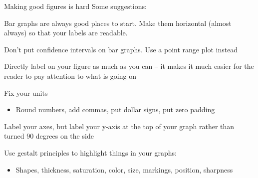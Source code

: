 \documentclass[notes,11pt, aspectratio=169]{beamer}
\newenvironment{wideitemize}{\itemize\addtolength{\itemsep}{10pt}}{\enditemize}
\begin{document}
\begin{frame}{Making good figures is hard}
  Some suggestions:
  \begin{wideitemize}
  \item Bar graphs are always good places to start. Make them
    horizontal (almost always) so that your labels are readable.
  \item Don't put confidence intervals on bar graphs. Use a point
    range plot instead
  \item Directly label on your figure as much as you can -- it makes
    it much easier for the reader to pay attention to what is going on
  \item Fix your units
    \begin{itemize}
    \item Round numbers, add commas, put dollar signs, put zero
      padding
    \end{itemize}
  \item Label your axes, but label your y-axis at the top of your
    graph rather than turned 90 degrees on the side
  \item Use gestalt principles to highlight things in your graphs:
    \begin{itemize}
    \item Shapes, thickness, saturation, color, size, markings,
      position, sharpness
    \end{itemize}
  \end{wideitemize}
  
\end{frame}
\end{document}
